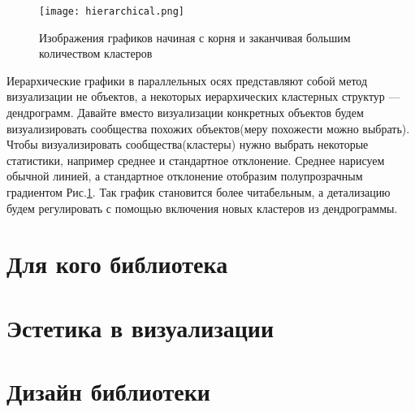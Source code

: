 \documentclass[12pt,fleqn]{article}
\begin{document}
\begin{figure}
    \centering
    \texttt{[image: hierarchical.png]}
    \caption{Изображения графиков начиная с корня и заканчивая большим количеством кластеров}
    \label{hierarchical_coords}
\end{figure}
Иерархические графики в параллельных осях представляют собой метод визуализации не объектов, а некоторых иерархических
кластерных структур --- дендрограмм. Давайте вместо визуализации конкретных объектов будем
визуализировать сообщества похожих объектов(меру похожести можно выбрать). Чтобы визуализировать сообщества(кластеры)
нужно выбрать некоторые статистики, например среднее и стандартное отклонение. Среднее нарисуем обычной линией, а 
стандартное отклонение отобразим полупрозрачным градиентом Рис.\ref{hierarchical_coords}. Так график становится 
более читабельным, а детализацию будем регулировать с помощью включения новых кластеров из дендрограммы.

\section{Для кого библиотека}
\section{Эстетика в визуализации}
\section{Дизайн библиотеки}
\end{document}

